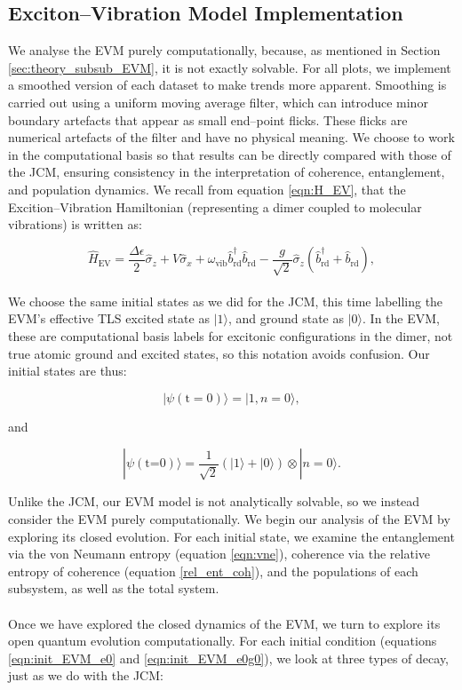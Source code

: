 \documentclass[11pt]{article}
\begin{document}
\subsection{Exciton--Vibration Model Implementation} \label{sec:method_sub_EVM}
We analyse the EVM purely computationally, because, as mentioned in Section \ref{sec:theory_subsub_EVM}, it is not exactly solvable. For all plots, we implement a smoothed version of each dataset to make trends more apparent. Smoothing is carried out using a uniform moving average filter, which can introduce minor boundary artefacts that appear as small end--point flicks. These flicks are numerical artefacts of the filter and have no physical meaning. We choose to work in the computational basis so that results can be directly compared with those of the JCM, ensuring consistency in the interpretation of coherence, entanglement, and population dynamics. We recall from equation \eqref{eqn:H_EV}, that the Excition--Vibration Hamiltonian (representing a dimer coupled to molecular vibrations) is written as:

\begin{equation*}
    \hat{H}_{\scriptscriptstyle \text{EV}} = \frac{\Delta\epsilon}{2}\hat{\sigma}_z + V\hat{\sigma}_x + \omega_{\scriptscriptstyle \text{vib}} \hat{b}_{\scriptscriptstyle \text{rd}}^\dagger \hat{b}_{\scriptscriptstyle \text{rd}} -\frac{g}{\sqrt{2}}\hat{\sigma}_z\left(\hat{b}_{\scriptscriptstyle \text{rd}}^\dagger + \hat{b}_{\scriptscriptstyle \text{rd}}\right),
\end{equation*}
\\
We choose the same initial states as we did for the JCM, this time labelling the EVM's effective TLS excited state as $|1\rangle$, and ground state as $|0\rangle$. In the EVM, these are computational basis labels for excitonic configurations in the dimer, not true atomic ground and excited states, so this notation avoids confusion. Our initial states are thus:

\begin{equation} \label{eqn:init_EVM_e0}
    |\psi (\text{t}=0)\rangle = |1,n=0\rangle,
\end{equation}

and 

\begin{equation}\label{eqn:init_EVM_e0g0}
    |\psi (\text{t=0})\rangle = \frac{1}{\sqrt{2}}(|1\rangle + |0\rangle)\otimes|n=0\rangle.
\end{equation}

Unlike the JCM, our EVM model is not analytically solvable, so we instead consider the EVM purely computationally. We begin our analysis of the EVM by exploring its closed evolution. For each initial state, we examine the entanglement via the von Neumann entropy (equation \eqref{eqn:vne}), coherence via the relative entropy of coherence (equation \eqref{rel_ent_coh}), and the populations of each subsystem, as well as the total system.\\
\\
Once we have explored the closed dynamics of the EVM, we turn to explore its open quantum evolution computationally. For each initial condition (equations \eqref{eqn:init_EVM_e0} and \eqref{eqn:init_EVM_e0g0}), we look at three types of decay, just as we do with the JCM:
\end{document}
